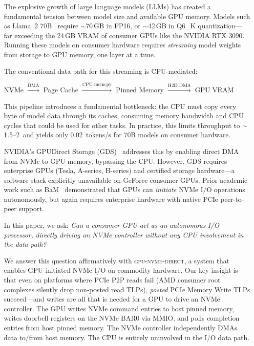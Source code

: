 \documentclass{article}
\newcommand{\sysname}{\textsc{gpu-nvme-direct}}
\newcommand{\GBs}{\,\text{GB/s}}
\begin{document}
The explosive growth of large language models (LLMs) has created a fundamental
tension between model size and available GPU memory. Models such as Llama~2
70B~\cite{touvron2023llama2} require $\sim$70\,GB in FP16, or $\sim$42\,GB in
Q6\_K quantization---far exceeding the 24\,GB VRAM of consumer GPUs like the
NVIDIA RTX 3090. Running these models on consumer hardware requires
\emph{streaming} model weights from storage to GPU memory, one layer at a time.

The conventional data path for this streaming is CPU-mediated:
\begin{center}
\small
NVMe $\xrightarrow{\text{DMA}}$ Page Cache $\xrightarrow{\text{CPU memcpy}}$
Pinned Memory $\xrightarrow{\text{H2D DMA}}$ GPU VRAM
\end{center}

This pipeline introduces a fundamental bottleneck: the CPU must copy every byte
of model data through its caches, consuming memory bandwidth and CPU cycles
that could be used for other tasks. In practice, this limits throughput to
$\sim$1.5--2\GBs{} and yields only 0.02~tokens/s for 70B models on consumer
hardware.

NVIDIA's GPUDirect Storage (GDS)~\cite{gds} addresses this by enabling direct
DMA from NVMe to GPU memory, bypassing the CPU. However, GDS requires
enterprise GPUs (Tesla, A-series, H-series) and certified storage hardware---a
software stack explicitly unavailable on GeForce consumer GPUs. Prior academic
work such as BaM~\cite{qureshi2023bam} demonstrated that GPUs can
\emph{initiate} NVMe I/O operations autonomously, but again requires enterprise
hardware with native PCIe peer-to-peer support.

In this paper, we ask: \emph{Can a consumer GPU act as an autonomous I/O
processor, directly driving an NVMe controller without any CPU involvement in
the data path?}

We answer this question affirmatively with \sysname{}, a system that enables
GPU-initiated NVMe I/O on commodity hardware. Our key insight is that even on
platforms where PCIe P2P reads fail (AMD consumer root complexes silently drop
non-posted read TLPs), \emph{posted} PCIe Memory Write TLPs succeed---and
writes are all that is needed for a GPU to drive an NVMe controller. The GPU
writes NVMe command entries to host pinned memory, writes doorbell registers on
the NVMe BAR0 via MMIO, and polls completion entries from host pinned memory.
The NVMe controller independently DMAs data to/from host memory. The CPU is
entirely uninvolved in the I/O data path.
\end{document}

